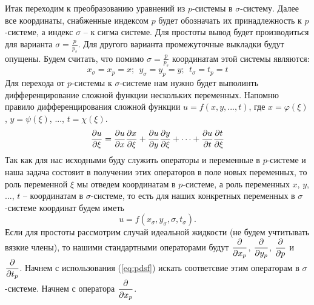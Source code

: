 Итак переходим к преобразованию уравнений из $p$-системы в $\sigma$-систему. Далее все координаты, снабженные индексом $p$ будет обозначать их принадлежность к $p$-системе, а индекс $\sigma$ -- к сигма системе. Для простоты вывод будет производиться для варианта $\sigma=\frac{p}{p_s}$.  Для другого варианта промежуточные выкладки будут опущены. Будем считать, что помимо $\sigma=\frac{p}{p_s}$ координатам этой системы являются: 
\begin{equation}
    x_{\sigma}=x_p=x; \:\:y_{\sigma}=y_p=y; \:\:t_{\sigma}=t_p=t
\end{equation}
Для перехода от $p$-системы к $\sigma$-системе нам нужно будет выполинть дифференцирование сложной функции нескольких переменных. Напомню правило дифференцирования сложной функции $u=f(x,y,...,t)$, где $x=\varphi(\xi)$, $y=\psi(\xi)$, ..., $t=\chi(\xi)$.
\begin{equation}
\label{eq:pdsf}
    \displaystyle\frac{\partial u}{\partial \xi}=\displaystyle\frac{\partial u}{\partial x}\displaystyle\frac{\partial x}{\partial \xi}+\displaystyle\frac{\partial u}{\partial y}\displaystyle\frac{\partial y}{\partial \xi}+\cdots+\displaystyle\frac{\partial u}{\partial t}\displaystyle\frac{\partial t}{\partial \xi}
\end{equation}
Так как для нас исходными буду служить операторы и переменные в $p$-системе и наша задача состояит в получении этих операторов в поле новых переменных, то роль переменной $\xi$ мы отведем координатам в $p$-системе, а роль переменных $x$, $y$, ..., $t$ -- координатам в $\sigma$-системе, то есть для наших конкретных переменных в $\sigma$-системе координат будем иметь
\begin{equation*}
    u=f(x_{\sigma},y_{\sigma},\sigma,t_{\sigma}).
\end{equation*}
Если для простоты рассмотрим случай идеальной жидкости (не будем учтитывать вязкие члены), то нашими стандартными операторами будут $\displaystyle\frac{\partial }{\partial x_p}$, $\displaystyle\frac{\partial }{\partial y_p}$, $\displaystyle\frac{\partial }{\partial p}$ и $\displaystyle\frac{\partial }{\partial t_p}$. Начнем с использования (\ref{eq:pdsf}) искать соответсвие этим операторам в $\sigma$-системе. Начнем с оператора $\displaystyle\frac{\partial }{\partial x_p}$.

